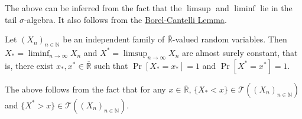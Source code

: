 The above can be inferred from the fact that the $\limsup$ and $\liminf$ lie in the tail $\sigma$-algebra. It also follows from the \hyperref[borelCantelliLemma]{Borel-Cantelli Lemma}.

\begin{corollary}
    Let $(X_n)_{n\in\mathbb{N}}$ be an independent family of $\overline{\mathbb{R}}$-valued random variables. Then $X_*=\liminf_{n\to\infty}X_n$ and $X^*=\limsup_{n\to\infty} X_n$ are almost surely constant, that is, there exist $x_*,x^*\in\overline{\mathbb{R}}$ such that $\Pr[X_*=x_*]=1$ and $\Pr[X^*=x^*]=1$.
\end{corollary}

The above follows from the fact that for any $x\in\overline{\mathbb{R}}$, $\{X_*<x\}\in\mathcal{T}((X_n)_{n\in\mathbb{N}})$ and $\{X^*>x\}\in\mathcal{T}((X_n)_{n\in\mathbb{N}})$.

\clearpage